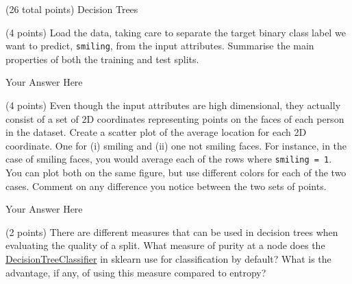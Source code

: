 \documentclass[12pt]{article}
\begin{document}
\clearpage


\begin{question}{(26 total points) Decision Trees}





%
%
\begin{subquestion}{(4 points) Load the data, taking care to separate the target binary class label we want to predict, \texttt{smiling}, from the input attributes. 
Summarise the main properties of both the training and test splits. 
}


\begin{answerbox}{12em}
Your Answer Here
\end{answerbox}



\end{subquestion}


%
%
\begin{subquestion}{(4 points) Even though the input attributes are high dimensional, they actually consist of a set of 2D coordinates representing points on the faces of each person in the dataset. 
Create a scatter plot of the average location for each 2D coordinate. One for (i) smiling and (ii) one not smiling faces. 
For instance, in the case of smiling faces, you would average each of the rows where \texttt{smiling = 1}. 
You can plot both on the same figure, but use different colors for each of the two cases. 
Comment on any difference you notice between the two sets of points. \\
}


\begin{answerbox}{35em}
Your Answer Here
\end{answerbox}



\end{subquestion}


%
%
\begin{subquestion}{(2 points) 
There are different measures that can be used in decision trees when evaluating the quality of a split. 
What measure of purity at a node does the \href{https://scikit-learn.org/0.19/modules/generated/sklearn.tree.DecisionTreeClassifier.html}{DecisionTreeClassifier} in sklearn use for classification by default? 
What is the advantage, if any, of using this measure compared to entropy? 
}



\end{subquestion}
\end{question}
\end{document}
